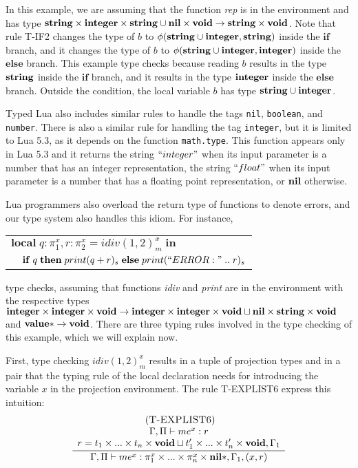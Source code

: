 In this example, we are assuming that the function \emph{rep} is in
the environment and has type
$\mathbf{string} \times \mathbf{integer} \times \mathbf{string} \cup \mathbf{nil} \times \mathbf{void} \rightarrow \mathbf{string} \times \mathbf{void}$.
Note that rule \textsc{T-IF2} changes the type of $b$ to
$\phi(\mathbf{string} \cup \mathbf{integer}, \mathbf{string})$ inside the $\mathbf{if}$ branch,
and it changes the type of $b$ to
$\phi(\mathbf{string} \cup \mathbf{integer}, \mathbf{integer})$ inside the $\mathbf{else}$ branch.
This example type checks because reading $b$ results in the type
$\mathbf{string}$ inside the $\mathbf{if}$ branch, and it results in the type
$\mathbf{integer}$ inside the $\mathbf{else}$ branch.
Outside the condition, the local variable $b$ has type $\mathbf{string} \cup \mathbf{integer}$.

Typed Lua also includes similar rules to handle the tags \texttt{nil},
\texttt{boolean}, and \texttt{number}.
There is also a similar rule for handling the tag \texttt{integer}, but
it is limited to Lua 5.3, as it depends on the function \texttt{math.type}.
This function appears only in Lua 5.3 and it returns the string $``integer"$
when its input parameter is a number that has an integer representation,
the string $``float"$ when its input parameter is a number that has a
floating point representation, or $\mathbf{nil}$ otherwise.

Lua programmers also overload the return type of functions to denote errors,
and our type system also handles this idiom.
For instance,
\begin{center}
\begin{tabular}{ll}
\multicolumn{2}{l}{$\mathbf{local} \; q:\pi_{1}^{x}, r:\pi_{2}^{x} = idiv(1, 2)_{m}^{x} \; \mathbf{in}$}\\
& \multicolumn{1}{l}{$\mathbf{if} \; q \; \mathbf{then} \; print(q + r)_{s} \; \mathbf{else} \; print(``ERROR: " \; .. \; r)_{s}$}
\end{tabular}
\end{center}
type checks, assuming that functions \emph{idiv} and \emph{print} are in
the environment with the respective types
$\mathbf{integer} \times \mathbf{integer} \times \mathbf{void} \rightarrow \mathbf{integer} \times \mathbf{integer} \times \mathbf{void} \sqcup \mathbf{nil} \times \mathbf{string} \times \mathbf{void}$
and
$\mathbf{value}{*} \rightarrow \mathbf{void}$.
There are three typing rules involved in the type checking of this example,
which we will explain now.

First, type checking $idiv(1, 2)_{m}^{x}$ results in a tuple of projection
types and in a pair that the typing rule of the local declaration needs
for introducing the variable $x$ in the projection environment.
The rule \textsc{T-EXPLIST6} express this intuition:
\[
\begin{array}{c}
\; (\textsc{T-EXPLIST6})\\
\dfrac{\begin{array}{c}
       \Gamma, \Pi \vdash me^{x}:r\\
       r = t_{1} \times ... \times t_{n} \times \mathbf{void} \sqcup t_{1}' \times ... \times t_{n}' \times \mathbf{void}, \Gamma_{1}
       \end{array}}
      {\Gamma, \Pi \vdash me^{x}:\pi_{1}^{x} \times ... \times \pi_{n}^{x} \times \mathbf{nil}{*}, \Gamma_{1}, (x,r)}
\end{array}
\]

